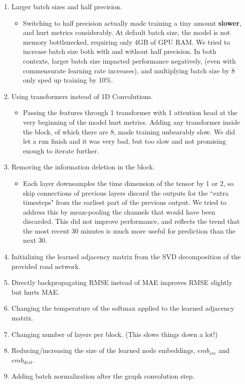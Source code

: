 \documentclass[10pt]{article}
\begin{document}
\begin{enumerate}
\begin{itemize}
    \end{itemize}
    \item Larger batch sizes and half precision.
    \begin{itemize}
    \item Switching to half precision actually made training a tiny amount \textbf{slower}, and hurt metrics considerably. At default batch size, the model is not memory bottlenecked, requiring only 4GB of GPU RAM. We tried to increase batch size both with and without half precision. In both contexts, larger batch size impacted performance negatively, (even with commensurate learning rate increases), and multiplying batch size by 8 only sped up training by 10\%.  
    \end{itemize}
    \item Using transformers instead of 1D Convolutions.
    \begin{itemize}
        \item  Passing  the features through 1 transformer with 1 attention head at the very beginning of the model hurt metrics. Adding any transformer inside the block, of which there are 8, made training unbearably slow. We did let a run finish and it was very bad, but too slow and not promising enough to iterate further.
    \end{itemize}
    \item Removing the information deletion in the block. 
    \begin{itemize}
        \item Each layer downsamples the time dimension of the tensor by 1 or 2, so skip connections of previous layers discard the outputs for the ``extra timesteps" from the earliest part of the previous output.  We tried to address this by mean-pooling the channels that would have been discarded. This did not improve performance, and reflects the trend that the most recent 30 minutes is much more useful for prediction than the next 30.
    \end{itemize}
    \item Initializing the learned adjacency matrix from the SVD decomposition of the provided road network.
    \item Directly backpropagating RMSE instead of MAE improves RMSE slightly but hurts MAE.
    \item Changing the temperature of the softmax applied to the learned adjacency matrix.
    \item Changing number of layers per block. (This slows things down a lot!)
    \item Reducing/increasing the size of the learned node embeddings, $emb_{src}$ and $emb_{dest}$.
    \item Adding batch normalization after the graph convolution step.
\end{enumerate}
\end{document}
